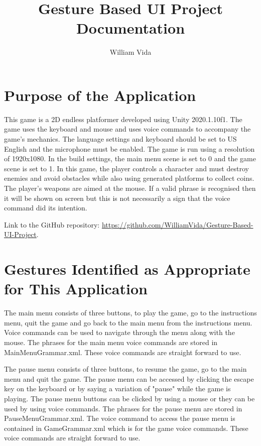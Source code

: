 \documentclass{article}
\title{Gesture Based UI Project Documentation}
\author{William Vida}
\date{}
\begin{document}
\maketitle

\section{Purpose of the Application}
This game is a 2D endless platformer developed using Unity 2020.1.10f1. The game uses the keyboard and mouse and uses voice commands to accompany the game's mechanics. The language settings and keyboard should be set to US English and the microphone must be enabled. The game is run using a resolution of 1920x1080. In the build settings, the main menu scene is set to 0 and the game scene is set to 1. In this game, the player controls a character and must destroy enemies and avoid obstacles while also using generated platforms to collect coins. The player's weapons are aimed at the mouse. If a valid phrase is recognised then it will be shown on screen but this is not necessarily a sign that the voice command did its intention.

Link to the GitHub repository: \url{https://github.com/WilliamVida/Gesture-Based-UI-Project}.

\section{Gestures Identified as Appropriate for This Application}
The main menu consists of three buttons, to play the game, go to the instructions menu, quit the game and go back to the main menu from the instructions menu. Voice commands can be used to navigate through the menu along with the mouse. The phrases for the main menu voice commands are stored in MainMenuGrammar.xml. These voice commands are straight forward to use.

The pause menu consists of three buttons, to resume the game, go to the main menu and quit the game. The pause menu can be accessed by clicking the escape key on the keyboard or by saying a variation of "pause" while the game is playing. The pause menu buttons can be clicked by using a mouse or they can be used by using voice commands. The phrases for the pause menu are stored in PauseMenuGrammar.xml. The voice command to access the pause menu is contained in GameGrammar.xml which is for the game voice commands. These voice commands are straight forward to use.
\end{document}
